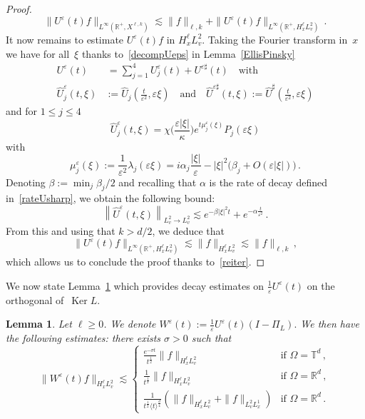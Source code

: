\documentclass[11pt]{article}
\newtheorem{lemm}[theo]{Lemma}
\theoremstyle{definition}
\numberwithin{equation}{section}
\numberwithin{figure}{section}
\numberwithin{table}{section}
\newcommand*\R {\mathbb{R}}
\newcommand*\T {\mathbb{T}}
\newcommand*\eps{{\varepsilon}}
\newcommand*\e{{\varepsilon}}
\begin{document}
\begin{proof}
\begin{equation}
\|U^\e(t)f\|_{L^\infty(\R^+,X^{\ell,k})}\lesssim \|f\|_{\ell,k} + \|U^\eps(t) f \|_{L^\infty(\R^+,H^\ell_xL^2_v)} \,.
\end{equation}
It now remains to estimate $U^\eps(t)f$ in $H^\ell_xL^2_v$. Taking the Fourier transform in~$x$ we have for all~$\xi $ thanks to~\eqref{decompUeps} in Lemma~\ref{EllisPinsky}
\begin{equation}\label{decUepsEP}
\begin{aligned}
U^\e(t) &\,= \sum_{j=1}^4 U_j^\e(t) + U^{\e\sharp}(t) \quad \text{with} \\
\widehat U_j^\e(t,\xi) &:= \widehat U_j\left(\frac{t}{\e^2},\e \xi\right) \quad \text{and} \quad\widehat U^{\e\sharp}(t,\xi) := \widehat U^\sharp\left(\frac{t}{\e^2},\e \xi\right)
\end{aligned}
\end{equation}
and for $1\le j \le 4$
\[
\widehat U^\e_j(t,\xi) = \chi\Big(\frac{\e |\xi|}\kappa\Big) e^{t \mu_j^\e(\xi)} P_j(\e \xi)
\]
with
\[
\mu_j^\e(\xi):=\frac{1}{\e^2} \lambda_j(\e \xi) = i \alpha_j \frac{|\xi|}{\e} - |\xi|^2\big(\beta_j + O(\e |\xi|)\big) \,.
\]
Denoting $\beta := \min_j \beta_j/2$ and recalling that $\alpha$ is the rate of decay defined in~\eqref{rateUsharp}, we obtain the following bound:
\[
\left\|\widehat U^\eps(t,\xi)\right\|_{L^2_v \to L^2_v} \lesssim e^{-\beta |\xi|^2 t} + e^{-\alpha \frac{t}{\eps^2}} \,.
\]
From this and using that $k >d/2$, we deduce that
\[
\|U^\eps(t) f \|_{L^\infty(\R^+,H^\ell_xL^2_v)} \lesssim \|f\|_{H^\ell_xL^2_v} \lesssim \|f\|_{\ell,k}\,,
\]
which allows us to conclude the proof thanks to~\eqref{reiter}.
\end{proof}

We now state Lemma~\ref{lem:decayWeps} which provides decay estimates on $\frac1\eps U^\eps(t)$ on the orthogonal of~$\operatorname{Ker} L$.

\begin{lemm}\label{lem:decayWeps}
Let $\ell\ge 0$. We denote $ W^\e (t):=\frac 1\e U^\e (t)(I-\Pi_{L}). $ We then have the following estimates: there exists $\sigma>0$ such that
\[
\|W^\e(t)f\|_{H^\ell_xL^2_v} \lesssim
\begin{cases}
\frac{e^{-\sigma t}}{t^{\frac12}} \|f\|_{H^\ell_xL^2_v} &\text{if } \Omega = \T^d \,, \\[0.5em]
\frac{1}{t^{\frac12}} \|f\|_{H^\ell_xL^2_v} &\text{if } \Omega = \R^d\,, \\[0.5em]
\frac{1}{{t^{\frac12} \langle t \rangle^\frac{d}{4}}} (\|f\|_{H^\ell_xL^2_v} + \|f\|_{L^2_vL^1_x}) &\text{if } \Omega = \R^d \,.
\end{cases}
\]
\end{lemm}
\end{document}
